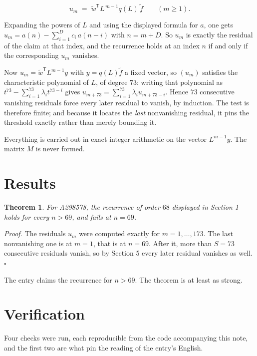\documentclass[11pt]{article}
\newtheorem{theorem}{Theorem}
\theoremstyle{definition}
\begin{document}
\[u_m \;=\; \tilde w^{\mathsf T} L^{\,m-1} q(L)\,\tilde f \qquad (m \ge 1).\]

Expanding the powers of $L$ and using the displayed formula for $a$, one gets $u_m = a(n) - \sum_{i=1}^{D} c_i\,a(n-i)$ with $n = m + D$. So $u_m$ is exactly the residual of the claim at that index, and the recurrence holds at an index $n$ if and only if the corresponding $u_m$ vanishes.

Now $u_m = \tilde w^{\mathsf T} L^{m-1} y$ with $y = q(L)\tilde f$ a fixed vector, so $(u_m)$ satisfies the characteristic polynomial of $L$, of degree $73$: writing that polynomial as $t^{73} - \sum_{i=1}^{73} \lambda_i t^{73-i}$ gives $u_{m+73} = \sum_{i=1}^{73} \lambda_i u_{m+73-i}$. Hence $73$ consecutive vanishing residuals force every later residual to vanish, by induction. The test is therefore finite; and because it locates the {\itshape last} nonvanishing residual, it pins the threshold exactly rather than merely bounding it.

Everything is carried out in exact integer arithmetic on the vector $L^{m-1}y$. The matrix $M$ is never formed.

\section{Results}

\begin{theorem} For A298578, the recurrence of order $68$ displayed in Section 1 holds for every $n > 69$, and fails at $n = 69$.\end{theorem}

{\itshape Proof.} The residuals $u_m$ were computed exactly for $m = 1,\dots,173$. The last nonvanishing one is at $m = 1$, that is at $n = 69$. After it, more than $S = 73$ consecutive residuals vanish, so by Section 5 every later residual vanishes as well. $\square$

The entry claims the recurrence for $n > 69$. The theorem is at least as strong.

\section{Verification}

Four checks were run, each reproducible from the code accompanying this note, and the first two are what pin the reading of the entry's English.
\end{document}
